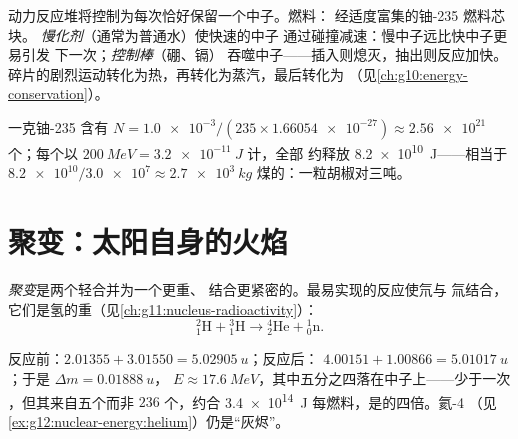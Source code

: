 \begin{definition}[驯服的反应堆]\label{def:g12:nuclear-energy:reactor}
动力反应堆将控制为每次恰好保留一个中子。燃料：
经适度富集的铀-235 燃料芯块。
\emph{慢化剂}（通常为普通水）使快速的中子
通过碰撞减速：慢中子远比快中子更易引发
下一次；\emph{控制棒}（硼、镉）
吞噬中子——插入则熄灭，抽出则反应加快。
碎片的剧烈运动转化为热，再转化为蒸汽，最后转化为
（见\cref{ch:g10:energy-conservation}）。
\end{definition}

\begin{example}[胡椒粒对卡车]\label{ex:g12:nuclear-energy:gram}
一克铀-235 含有
$N = \num{1.0e-3} / (235 \times \num{1.66054e-27}) \approx \num{2.56e21}$
个；每个以 $\qty{200}{MeV} = \qty{3.2e-11}{J}$ 计，全部
约释放 \qty{8.2e10}{J}——相当于 $\num{8.2e10} /
\num{3.0e7} \approx \qty{2.7e3}{kg}$ 煤的：一粒胡椒对三吨。
\end{example}

\section{聚变：太阳自身的火焰}

\begin{definition}[聚变]\label{def:g12:nuclear-energy:fusion}
\emph{聚变}是两个轻合并为一个更重、
结合更紧密的。最易实现的反应使氘与
氚结合，它们是氢的重（见\cref{ch:g11:nucleus-radioactivity}）：
\[
{}^{2}_{1}\mathrm{H} + {}^{3}_{1}\mathrm{H} \longrightarrow
{}^{4}_{2}\mathrm{He} + {}^{1}_{0}\mathrm{n}.
\]
\end{definition}

\begin{example}[D--T，称量]\label{ex:g12:nuclear-energy:dt}
反应前：$2.01355 + 3.01550 = \qty{5.02905}{u}$；反应后：
$4.00151 + 1.00866 = \qty{5.01017}{u}$；于是 $\Delta m = \qty{0.01888}{u}$，
$E \approx \qty{17.6}{MeV}$，其中五分之四落在中子上——少于一次
，但其来自五个而非 $236$ 个，约合 \qty{3.4e14}{J}
每燃料，是的四倍。氦-4
（见\cref{ex:g12:nuclear-energy:helium}）仍是“灰烬”。
\end{example}

